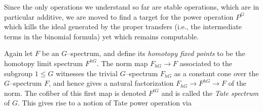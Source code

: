 Since the only operations we understand so far are stable operations, which are in particular additive, we are moved to find a target for the power operation $P^G$ which kills the ideal generated by the proper transfers (i.e., the intermediate terms in the binomial formula) yet which remains computable.

\begin{definition}
Again let $F$ be an $G$--spectrum, and define its \textit{homotopy fixed points} to be the homotopy limit spectrum $F^{hG}$.  The norm map $F_{hG} \to F$ associated to the subgroup $1 \le G$ witnesses the trivial $G$--spectrum $F_{hG}$ as a constant cone over the $G$--spectrum $F$, and hence gives a natural factorization $F_{hG} \to F^{hG} \to F$ of the norm.  The cofiber of this first map is denoted $F^{tG}$ and is called the \textit{Tate spectrum} of $G$.  This gives rise to a notion of Tate power operation via
\begin{center}
\end{center}
\end{definition}

